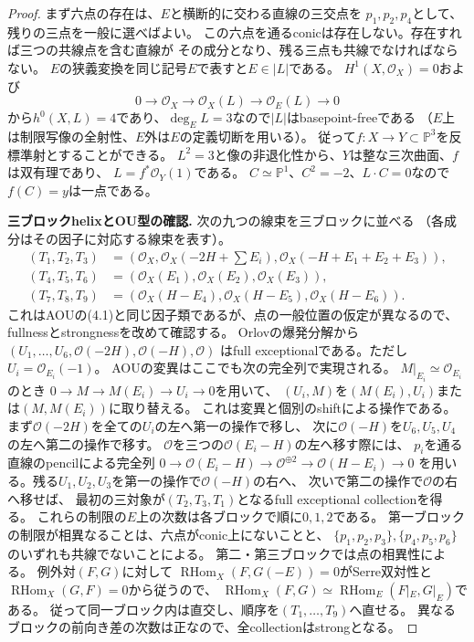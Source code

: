 \documentclass[11pt,a4paper]{ltjsarticle}
\theoremstyle{definition}
\begin{document}
\begin{proof}
まず六点の存在は、$E$と横断的に交わる直線の三交点を
$p_1,p_2,p_4$として、残りの三点を一般に選べばよい。
この六点を通るconicは存在しない。存在すれば三つの共線点を含む直線が
その成分となり、残る三点も共線でなければならない。
$E$の狭義変換を同じ記号$E$で表すと$E\in|L|$である。
$H^1(X,\mathcal O_X)=0$および
\[
 0\to\mathcal O_X\to\mathcal O_X(L)
   \to\mathcal O_E(L)\to0
\]
から$h^0(X,L)=4$であり、$\deg_E L=3$なので$|L|$はbasepoint-freeである
（$E$上は制限写像の全射性、$E$外は$E$の定義切断を用いる）。
従って$f:X\to Y\subset\mathbb P^3$を反標準射とすることができる。
$L^2=3$と像の非退化性から、$Y$は整な三次曲面、$f$は双有理であり、
$L=f^*\mathcal O_Y(1)$である。
$C\simeq\mathbb P^1$、$C^2=-2$、$L\cdot C=0$なので$f(C)=y$は一点である。

\medskip
\noindent\textbf{三ブロックhelixとOU型の確認.}
次の九つの線束を三ブロックに並べる
（各成分はその因子に対応する線束を表す）。
\[
\begin{split}
 (T_1,T_2,T_3)&=(\mathcal O_X,\mathcal O_X(-2H+\textstyle\sum E_i),
                  \mathcal O_X(-H+E_1+E_2+E_3)),\\
 (T_4,T_5,T_6)&=(\mathcal O_X(E_1),\mathcal O_X(E_2),\mathcal O_X(E_3)),\\
 (T_7,T_8,T_9)&=(\mathcal O_X(H-E_4),\mathcal O_X(H-E_5),\mathcal O_X(H-E_6)).
\end{split}
\]
これはAOUの(4.1)と同じ因子類であるが、点の一般位置の仮定が異なるので、
fullnessとstrongnessを改めて確認する。
Orlovの爆発分解から
$(U_1,\ldots,U_6,\mathcal O(-2H),\mathcal O(-H),\mathcal O)$
はfull exceptionalである。ただし$U_i=\mathcal O_{E_i}(-1)$。
AOU\cite[(9.28)--(9.40)]{AOU2024}の変異はここでも次の完全列で実現される。
$M|_{E_i}\simeq\mathcal O_{E_i}$のとき
$0\to M\to M(E_i)\to U_i\to0$を用いて、
$(U_i,M)$を$(M(E_i),U_i)$または$(M,M(E_i))$に取り替える。
これは変異と個別のshiftによる操作である。
まず$\mathcal O(-2H)$を全ての$U_i$の左へ第一の操作で移し、
次に$\mathcal O(-H)$を$U_6,U_5,U_4$の左へ第二の操作で移す。
$\mathcal O$を三つの$\mathcal O(E_i-H)$の左へ移す際には、
$p_i$を通る直線のpencilによる完全列
$0\to\mathcal O(E_i-H)\to\mathcal O^{\oplus2}\to\mathcal O(H-E_i)\to0$
を用いる。残る$U_1,U_2,U_3$を第一の操作で$\mathcal O(-H)$の右へ、
次いで第二の操作で$\mathcal O$の右へ移せば、
最初の三対象が$(T_2,T_3,T_1)$となるfull exceptional collectionを得る。
これらの制限の$E$上の次数は各ブロックで順に$0,1,2$である。
第一ブロックの制限が相異なることは、六点がconic上にないことと、
$\{p_1,p_2,p_3\},\{p_4,p_5,p_6\}$のいずれも共線でないことによる。
第二・第三ブロックでは点の相異性による。
例外対$(F,G)$に対して
$\operatorname{RHom}_X(F,G(-E))=0$がSerre双対性と
$\operatorname{RHom}_X(G,F)=0$から従うので、
$\operatorname{RHom}_X(F,G)\simeq\operatorname{RHom}_E(F|_E,G|_E)$である。
従って同一ブロック内は直交し、順序を$(T_1,\ldots,T_9)$へ直せる。
異なるブロックの前向き差の次数は正なので、全collectionはstrongとなる。


\end{proof}
\end{document}
